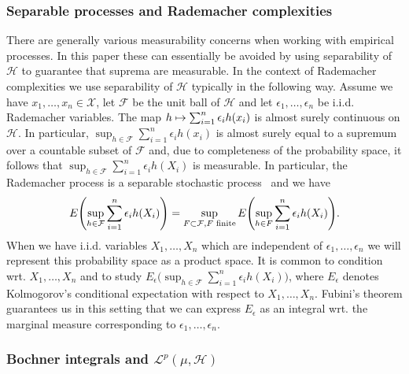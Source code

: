 \documentclass[10pt]{amsart}
\theoremstyle{definition}\newtheorem{defi}[theo]{Definition}\newtheorem{rema}[theo]{Remark}\newtheorem{exam}[theo]{Example}\newtheorem{exem}[theo]{Example}\newtheorem{nota}[theo]{Notation}
\theoremstyle{remark}
\newcommand{\X}{\mathcal{X}}
\newcommand{\cH}{\mathcal{H}}
\newcommand{\clL}{\mathcal{L}}
\newcommand{\clF}{\mathcal{F}}
\let\oldmapsto\mapsto
\renewcommand*{\mapsto}{\mathchoice{\longmapsto}{\oldmapsto}{\oldmapsto}{\oldmapsto}}
\let\originalleft\left
\let\originalright\right
\renewcommand{\left}{\mathopen{}\mathclose\bgroup\originalleft}
\renewcommand{\right}{\aftergroup\egroup\originalright}
\begin{document}
\subsubsection{Separable processes and Rademacher complexities}

There are generally various measurability concerns when working with empirical processes. In this paper these can essentially be avoided by using separability of $\cH$ to guarantee that suprema are measurable. In the context of Rademacher complexities we use separability of $\cH$ typically in the following way. Assume we have $x_1,\dots, x_n \in \X$, let $\clF$ be the unit ball of $\cH$ and let $\epsilon_1,\dots, \epsilon_n$ be i.i.d. Rademacher variables. The map $h \mapsto \sum_{i=1}^n \epsilon_i h(x_i)$ is almost surely continuous on $\cH$. In particular, $\sup_{h \in \clF} \sum_{i=1}^n \epsilon_i h(x_i)$ is almost surely equal to a supremum over a countable subset of $\clF$ and, due to completeness of the probability space, it follows that $\sup_{h \in \clF} \sum_{i=1}^n \epsilon_i h(X_i)$ is measurable. In particular, the Rademacher process is a separable stochastic process~\cite[Definition~4.1.2]{GINE15} and we have
\begin{equation}\label{eq:Rade_sep}
E\left(\sup_{h \in \clF} \sum_{i=1}^n \epsilon_i h(X_i)\right) = \sup_{F \subset \clF, F \text{ finite}} E\left(\sup_{h \in F} \sum_{i=1}^n \epsilon_i h(X_i)\right).
\end{equation}
When we have i.i.d. variables $X_1,\dots,X_n$ which are independent of $\epsilon_1,\dots, \epsilon_n$ we will represent this probability space as a product space. It is common to condition wrt. $X_1,\dots, X_n$ and to study $E_\epsilon \bigl(\sup_{h \in \clF} \sum_{i=1}^n \epsilon_i h(X_i) \bigr)$, where $E_\epsilon$ denotes Kolmogorov's conditional expectation with respect to $X_1,\dots, X_n$. Fubini's theorem guarantees us in this setting that we can express $E_\epsilon$ as an integral wrt. the marginal measure corresponding to $\epsilon_1,\dots, \epsilon_n$.

\subsubsection{Bochner integrals and $\clL^p(\mu,\cH)$}
\end{document}
